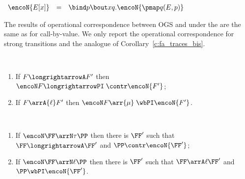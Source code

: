 

\begin{lemma}
\label{l:Ex}
$ 
\begin{array}{rcl}
\encoN {E [x]} & = & \bind p 
\bout x {q}.  \encoN { \pmap q{(E,p)}} 
\end{array} 
$
\end{lemma} 
\noindent
The results of operational correspondence between OGS and \piI under the \opLTS are the
same as for call-by-value. 
We only report the operational correspondence for strong transitions and the 
analogue of Corollary~\ref{c:fa_traces_bis}.  


\begin{theorem}%
\label{t:opcorrCON_cbnshort}
$ $ \begin{enumerate}


\item  If $F \longrightarrowA F'$ then 
$ \encoN F \longrightarrowPI \;   \contr \encoN {F'}$; 

\item  If $F \arrA{\ell} F'$  %
then 
$ \encoN F \arr{\mu}  \; \wbPI  \encoN  {F'}$.
\end{enumerate}
\end{theorem} 


\begin{theorem} %
\label{t:opcorrCON3cbn}
$ $ \begin{enumerate}

\item If 
$ \encoN \FF \arrN \tau \PP$ then there is $\FF'$ such that 
$\FF \longrightarrowA \FF'$  and  
$\PP   \contr \encoN {\FF'}$; 


\item If
$ \encoN \FF \arrN\ell \PP$
 then there is $\FF'$ such that
 $\FF \arrA\ell \FF'$
and $\PP \wbPI \encoN {\FF'}$.
\end{enumerate} 
\end{theorem} 


